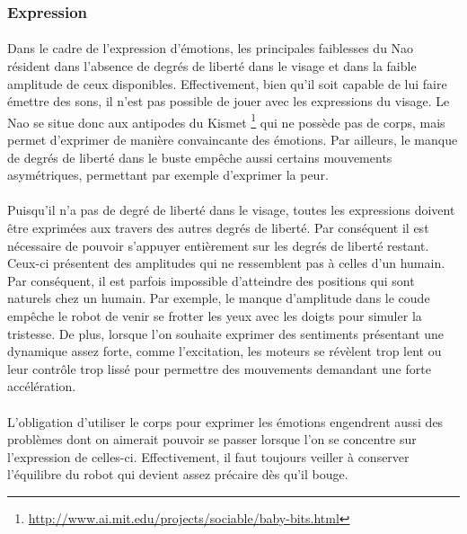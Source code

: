 \subsubsection{Expression}
\paragraph{}
Dans le cadre de l'expression d'émotions, les principales faiblesses du Nao
résident dans l'absence de degrés de liberté dans le visage et
dans la faible amplitude de ceux disponibles. Effectivement, bien qu'il soit
capable de lui faire émettre des sons, il n'est pas possible de jouer avec 
les expressions du visage. Le Nao se situe donc aux antipodes du Kismet
\footnote{\url{http://www.ai.mit.edu/projects/sociable/baby-bits.html}} qui
ne possède pas de corps, mais permet d'exprimer de manière convaincante des
émotions. Par ailleurs, le manque de degrés de liberté dans le buste empêche
aussi certains mouvements asymétriques, permettant par exemple d'exprimer la
peur.

\paragraph{}
Puisqu'il n'a pas de degré de liberté dans le visage, toutes les expressions
doivent être exprimées aux travers des autres degrés de liberté. Par
conséquent il est nécessaire de pouvoir s'appuyer entièrement sur les degrés
de liberté restant. Ceux-ci présentent des amplitudes qui ne ressemblent pas
à celles d'un humain. Par conséquent, il est parfois impossible d'atteindre
des positions qui sont naturels chez un humain. Par exemple, le manque
d'amplitude dans le coude empêche le robot de venir se frotter les yeux avec
les doigts pour simuler la tristesse. De plus, lorsque l'on souhaite
exprimer des sentiments présentant une dynamique assez forte, comme
l'excitation, les moteurs se révèlent trop lent ou leur contrôle trop lissé
pour permettre des mouvements demandant une forte accélération.

\paragraph{}
L'obligation d'utiliser le corps pour exprimer les émotions engendrent aussi
des problèmes dont on aimerait pouvoir se passer lorsque l'on se concentre
sur l'expression de celles-ci. Effectivement, il faut toujours veiller à
conserver l'équilibre du robot qui devient assez précaire dès qu'il bouge.

